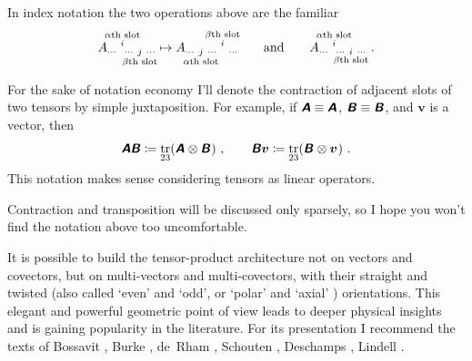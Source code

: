 \documentclass[\ifafour a4paper,12pt,\else a5paper,10pt,\fi%
onecolumn,oneside,article,%
british%
]{memoir}
\makeatletter
\newcommand*{\defquote}[1]{`#1'}
\theoremstyle{remark}
\theoremstyle{innote}
\newcommand*{\mathte}[1]{\textbf{\textit{\textsf{#1}}}}
\newcommand*{\citep}{\footcites}
\newcommand*{\citey}{\parencites*}%
\DeclareMathOperator{\tr}{tr}%
\newcommand*{\defd}{\coloneqq}
\renewcommand*{\|}[1][]{\nonscript\,#1\vert\nonscript\;\mathopen{}}
\newcommand*{\chap}{ch.}%
\newcommand*{\q}{}%
\DeclareRobustCommand*{\q}{%
  \mathord{\mathpalette\bigcdot@{}}%
}
\newcommand*{\bigcdot@scalefactor}{0.7}
\newcommand*{\bigcdot@widthfactor}{1.5}
\newcommand*{\bigcdot@}[2]{%
  \sbox0{$#1\vcenter{}$}%
  \sbox2{$#1\cdot\m@th$}%
  \hbox to \bigcdot@widthfactor\wd2{%
    \hfil
    \raise\ht0\hbox{%
      \scalebox{\bigcdot@scalefactor}{%
        \lower\ht0\hbox{$#1\bullet\m@th$}%
      }%
    }%
    \hfil
  }%
}
\newcommand*{\yA}{\mathte{A}}
\newcommand*{\yB}{\mathte{B}}
\newcommand*{\yv}{\bm{v}}
\renewcommand*{\i}{\indices}
\makeatother
\begin{document}
In index notation the two operations above are the familiar
\begin{equation*}
  A\i{_{\dotsm\ }^{%
      \overset{\mathclap{\scriptstyle\text{$\alpha$th slot}}}{i}
    }_{\dotsm\ %
      \underset{\mathclap{\scriptstyle\text{$\beta$th slot}}}{j}
      \ \dotsm}}
  \mapsto
  A\i{_{\dotsm\ %
      \underset{\mathclap{\scriptstyle\text{$\alpha$th slot}}}{j}
      \ \dotsm\ }^{%
      \overset{\mathclap{\scriptstyle\text{$\beta$th slot}}}{i}
    }_{\ \dotsm}} 
  \qquad\text{and}\qquad
  A\i{_{\dotsm\ }^{%
      \overset{\mathclap{\scriptstyle\text{$\alpha$th slot}}}{i}
    }_{\dotsm\ %
      \underset{\mathclap{\scriptstyle\text{$\beta$th slot}}}{i}
      \ \dotsm}} \ .
\end{equation*}

For the sake of notation economy I'll denote the contraction of adjacent
slots of two tensors by simple juxtaposition. For example, if
$\yA \equiv \yA\i{_{\q}^{\q}}$, $\yB \equiv \yB\i{_{\q\q}}$, and $\yv$ is a
vector, then
\begin{equation}
  \label{eq:simple_contraction}
  \yA\yB \defd \tr_{23}(\yA\i{_{\q}^{\q}}\otimes\yB\i{_{\q\q}})\ ,
  \qquad
  \yB\yv \defd \tr_{23}(\yB\i{_{\q\q}} \otimes \yv\i{^{\q}}) \ .
\end{equation}
This notation makes sense considering tensors as linear operators.

Contraction and transposition will be discussed only sparsely, so I hope
you won't find the notation above too uncomfortable.


\bigskip


It is possible to build the tensor-product architecture not on vectors and
covectors, but on multi-vectors and multi-covectors, with their straight
and twisted (also called \defquote{even} and
\defquote{odd}, %
or \defquote{polar} and \defquote{axial}%
) orientations. This elegant and powerful geometric point of view leads to
deeper physical insights and is gaining popularity in the literature. For
its presentation I recommend the texts of Bossavit \citey[especially
\chap~3]{bossavit1991}, Burke
\citey{burke1983,burke1985_r1987,burke1980b,burke1995}, de~Rham
\citey[\chap~2]{derham1955_t1984}, Schouten \citey{schouten1924_r1954},
Deschamps \citey{deschamps1970,deschamps1981}, Lindell \citey{lindell2004}.
\end{document}
